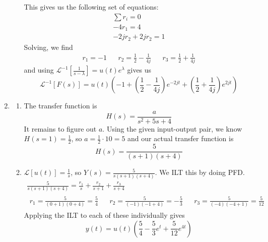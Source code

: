 \documentclass[12pt]{article}
\newcommand{\lt}[1]{\mathcal{L}\left[#1\right]}
\newcommand{\ilt}[1]{\mathcal{L}^{-1}\left[#1\right]}
\begin{document}
\begin{enumerate}
\begin{enumerate}
                        This gives us the following set of equations:
                        \begin{gather*}
                              \sum r_i=0 \\
                              -4r_1=4 \\
                              -2jr_2+2jr_2=1
                        \end{gather*}
                        Solving, we find
                        \begin{align*}
                              r_1=-1 &  & r_2=\frac{1}{2}-\frac{1}{4j} &  & r_3=\frac{1}{2}+\frac{1}{4j}
                        \end{align*}
                        and using $\ilt{\frac{1}{s-\lambda}}=u(t)e^{\lambda}$ gives us
                        \[\boxed{\ilt{F(s)}=u(t)\left(-1+\left(\frac{1}{2}-\frac{1}{4j}\right)e^{-2jt}+\left(\frac{1}{2}+\frac{1}{4j}\right)e^{2jt}\right)}\]
            \end{enumerate}
      \item \begin{enumerate}
                  \item The transfer function is
                        \[H(s)=\frac{a}{s^2+5s+4}\]
                        It remains to figure out $a$.
                        Using the given input-output pair, we know $H(s=1)=\frac{1}{2}$,
                        so $a=\frac{1}{2} \cdot 10=5$ and our actual transfer function is
                        \[\boxed{H(s)=\frac{5}{(s+1)(s+4)}}\]
                  \item $\lt{u(t)}=\frac{1}{s}$, so $Y(s)=\frac{5}{s(s+1)(s+4)}$.
                        We ILT this by doing PFD.
                        \begin{gather*}
                              \frac{5}{s(s+1)(s+4)}=\frac{r_1}{s}+\frac{r_2}{s+1}+\frac{r_3}{s+4} \\
                              \begin{aligned}
                                    r_1=\frac{5}{(0+1)(0+4)}=\frac{5}{4}  &  &
                                    r_2=\frac{5}{(-1)(-1+4)}=-\frac{5}{3} &  &
                                    r_3=\frac{5}{(-4)(-4+1)}=\frac{5}{12}
                              \end{aligned}
                        \end{gather*}
                        Applying the ILT to each of these individually gives
                        \[\boxed{y(t)=u(t)\left(\frac{5}{4}-\frac{5}{3}e^t+\frac{5}{12}e^{4t}\right)}\]

\end{enumerate}
\end{enumerate}
\end{document}
